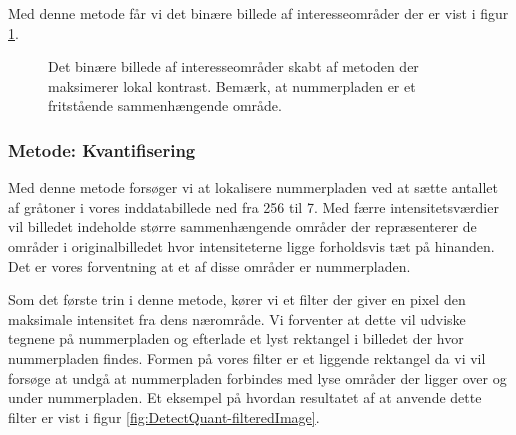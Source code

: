 Med denne metode får vi det binære billede af interesseområder der er vist i figur \ref{fig:DetectCStretch-binary}.

\begin{figure}[htp]
  \centering
  \caption{Det binære billede af interesseområder skabt af metoden der maksimerer lokal kontrast. Bemærk, at nummerpladen er et fritstående sammenhængende område.}
  \label{fig:DetectCStretch-binary}
\end{figure}

\subsubsection{Metode: Kvantifisering}
Med denne metode forsøger vi at lokalisere nummerpladen ved at sætte antallet af gråtoner i vores inddatabillede ned fra 256 til 7. Med færre intensitetsværdier vil billedet indeholde større sammenhængende områder der repræsenterer de områder i originalbilledet hvor intensiteterne ligge forholdsvis tæt på hinanden. Det er vores forventning at et af disse områder er nummerpladen.

Som det første trin i denne metode, kører vi et filter der giver en pixel den maksimale intensitet fra dens nærområde. Vi forventer at dette vil udviske tegnene på nummerpladen og efterlade et lyst rektangel i billedet der hvor nummerpladen findes. Formen på vores filter er et liggende rektangel da vi vil forsøge at undgå at nummerpladen forbindes med lyse områder der ligger over og under nummerpladen. Et eksempel på hvordan resultatet af at anvende dette filter er vist i figur \vref{fig:DetectQuant-filteredImage}. 

